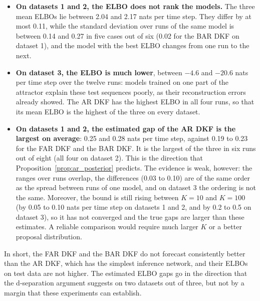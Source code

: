 \begin{itemize}
    \item \textbf{On datasets 1 and 2, the ELBO does not rank the
    models.} The three mean ELBOs lie between 2.04 and 2.17 nats per
    time step. They differ by at most 0.11, while the standard deviation
    over runs of the same model is between 0.14 and 0.27 in five cases
    out of six (0.02 for the BAR DKF on dataset 1), and the model with
    the best ELBO changes from one run to the next.
    \item \textbf{On dataset 3, the ELBO is much lower}, between $-4.6$
    and $-20.6$ nats per time step over the twelve runs: models trained
    on one part of the attractor explain these test sequences poorly,
    as their reconstruction errors already showed. The AR DKF has the
    highest ELBO in all four runs, so that its mean ELBO is the highest
    of the three on every dataset.
    \item \textbf{On datasets 1 and 2, the estimated gap of the AR DKF
    is the largest on average}: 0.25 and 0.28 nats per time step,
    against 0.19 to 0.23 for the FAR DKF and the BAR DKF. It is the
    largest of the three in six runs out of eight (all four on
    dataset 2). This is the direction that
    Proposition~\ref{prop:ar_posterior} predicts. The evidence is weak,
    however: the ranges over runs overlap, the differences (0.03 to
    0.10) are of the same order as the spread between runs of one model,
    and on dataset 3 the ordering is not the same. Moreover, the bound is
    still rising between $K = 10$ and $K = 100$ (by 0.05 to 0.10 nats per
    time step on datasets 1 and 2, and by 0.2 to 0.5 on dataset 3), so it
    has not converged and the true gaps are larger than these estimates.
    A reliable comparison would require much larger $K$ or a better
    proposal distribution.
\end{itemize}

\noindent In short, the FAR DKF and the BAR DKF do not forecast
consistently better than the AR DKF, which has the simplest inference
network, and their ELBOs on test data are not higher. The estimated ELBO
gaps go in the direction that the d-separation argument suggests on two
datasets out of three, but not by a margin that these experiments can
establish.
